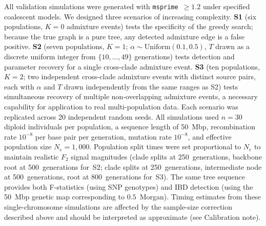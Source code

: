 All validation simulations were generated with \texttt{msprime}~$\geq 1.2$
\citep{Kelleher2016} under specified coalescent models.
We designed three scenarios of increasing complexity.
\textbf{S1} (six populations, $K=0$ admixture events) tests the specificity
of the greedy search; because the true graph is a pure tree, any detected
admixture edge is a false positive.
\textbf{S2} (seven populations, $K=1$; $\alpha \sim \mathrm{Uniform}(0.1, 0.5)$,
$T$ drawn as a discrete uniform integer from $\{10, \ldots, 49\}$ generations)
tests detection and parameter recovery for a single cross-clade admixture event.
\textbf{S3} (ten populations, $K=2$; two independent cross-clade admixture
events with distinct source pairs, each with $\alpha$ and $T$ drawn independently
from the same ranges as S2) tests simultaneous recovery of multiple
non-overlapping admixture events, a necessary capability for application to
real multi-population data.
Each scenario was replicated across 20 independent random seeds.
All simulations used $n = 30$ diploid individuals per population,
a sequence length of 50~Mbp, recombination rate
$10^{-8}$ per base pair per generation, mutation rate $10^{-8}$, and
effective population size $N_e = 1{,}000$.
Population split times were set proportional to $N_e$ to maintain
realistic $F_2$ signal magnitudes (clade splits at 250~generations, backbone
root at 500~generations for~S2; clade splits at 250~generations, intermediate
node at 500~generations, root at 800~generations for~S3).
The same tree sequence provides both F-statistics (using SNP genotypes) and
IBD detection (using the 50~Mbp genetic map corresponding to $0.5$~Morgan).
Timing estimates from these single-chromosome simulations are affected by
the sample-size correction described above and should be interpreted as
approximate (see Calibration note).
